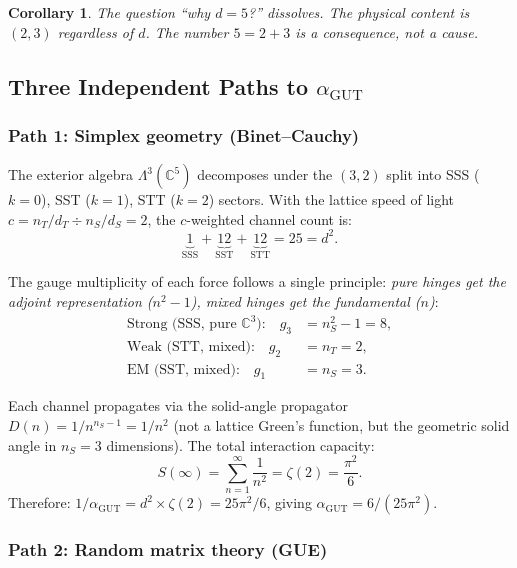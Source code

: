 \documentclass[12pt]{article}
\newtheorem{corollary}[theorem]{Corollary}
\theoremstyle{remark}
\theoremstyle{definition}
\newcommand{\CC}{\mathbb{C}}
\newcommand{\agut}{\alpha_{\mathrm{GUT}}}
\begin{document}
\begin{corollary}
The question ``why $d = 5$?'' dissolves. The physical content is $(2, 3)$ regardless of $d$. The number $5 = 2 + 3$ is a consequence, not a cause.
\end{corollary}

\subsection{Three Independent Paths to $\agut$}

\subsubsection{Path 1: Simplex geometry (Binet--Cauchy)}

The exterior algebra $\Lambda^3(\CC^5)$ decomposes under the $(3,2)$ split into SSS ($k=0$), SST ($k=1$), STT ($k=2$) sectors. With the lattice speed of light $c = n_T/d_T \div n_S/d_S = 2$, the $c$-weighted channel count is:
\begin{equation}
\underbrace{1}_{\text{SSS}} + \underbrace{12}_{\text{SST}} + \underbrace{12}_{\text{STT}} = 25 = d^2.
\end{equation}

The gauge multiplicity of each force follows a single principle: \emph{pure hinges get the adjoint representation ($n^2-1$), mixed hinges get the fundamental ($n$)}:
\begin{align}
\text{Strong (SSS, pure } \CC^3\text{):} \quad g_3 &= n_S^2 - 1 = 8, \\
\text{Weak (STT, mixed):} \quad g_2 &= n_T = 2, \\
\text{EM (SST, mixed):} \quad g_1 &= n_S = 3.
\end{align}

Each channel propagates via the solid-angle propagator $D(n) = 1/n^{n_S-1} = 1/n^2$ (not a lattice Green's function, but the geometric solid angle in $n_S = 3$ dimensions). The total interaction capacity:
\begin{equation}
S(\infty) = \sum_{n=1}^{\infty} \frac{1}{n^2} = \zeta(2) = \frac{\pi^2}{6}.
\end{equation}
Therefore: $1/\agut = d^2 \times \zeta(2) = 25\pi^2/6$, giving $\agut = 6/(25\pi^2)$.

\subsubsection{Path 2: Random matrix theory (GUE)}
\end{document}
